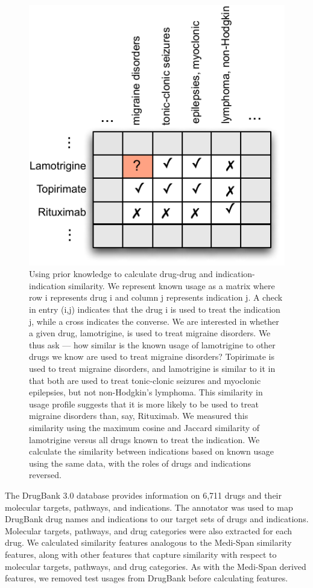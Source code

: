 \begin{figure}
  \begin{center}
    \includegraphics[width=0.6\linewidth]{ch2-figures/Figure4.pdf}
  \end{center}
  \caption[Using prior knowledge to calculate drug-drug and
    indication-indication similarity]{Using prior knowledge to
    calculate drug-drug and indication-indication similarity.  We
    represent known usage as a matrix where row i represents drug i
    and column j represents indication j.  A check in entry (i,j)
    indicates that the drug i is used to treat the indication j, while
    a cross indicates the converse.  We are interested in whether a
    given drug, lamotrigine, is used to treat migraine disorders.  We
    thus ask — how similar is the known usage of lamotrigine to other
    drugs we know are used to treat migraine disorders?  Topirimate is
    used to treat migraine disorders, and lamotrigine is similar to it
    in that both are used to treat tonic-clonic seizures and myoclonic
    epilepsies, but not non-Hodgkin's lymphoma.  This similarity in
    usage profile suggests that it is more likely to be used to treat
    migraine disorders than, say, Rituximab.  We measured this
    similarity using the maximum cosine and Jaccard similarity of
    lamotrigine versus all drugs known to treat the indication.  We
    calculate the similarity between indications based on known usage
    using the same data, with the roles of drugs and indications
    reversed.}
  \label{fig:short}
\end{figure}

The DrugBank 3.0 \cite{Knox2011} database provides information on
6,711 drugs and their molecular targets, pathways, and indications.
The annotator was used to map DrugBank drug names and indications to
our target sets of drugs and indications. Molecular targets, pathways,
and drug categories were also extracted for each drug.  We calculated
similarity features analogous to the Medi-Span similarity features,
along with other features that capture similarity with respect to
molecular targets, pathways, and drug categories.  As with the
Medi-Span derived features, we removed test usages from DrugBank
before calculating features.  

